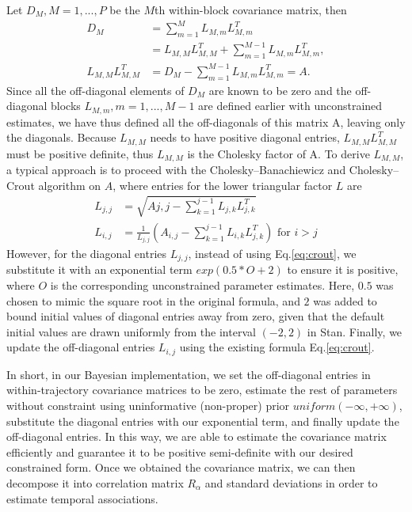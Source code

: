 \documentclass[aoas,preprint]{imsart}
\begin{document}
Let $D_M, M = 1, ..., P$ be the $M$th within-block covariance matrix, then 
\begin{equation}
\begin{aligned}
D_M &= \sum_{m=1}^{M} L_{M,m} L_{M,m}^T \\
&= L_{M,M} L_{M,M}^T + \sum_{m=1}^{M-1} L_{M,m} L_{M,m}^T, \\
L_{M,M} L_{M,M}^T &= D_M - \sum_{m=1}^{M-1} L_{M,m} L_{M,m}^T = A.
\end{aligned}
\end{equation}
Since all the off-diagonal elements of $D_M$ are known to be zero and the off-diagonal blocks $L_{M, m}, m = 1, ..., M-1$ are defined earlier with unconstrained estimates, we have thus defined all the off-diagonals of this matrix A, leaving only the diagonals. Because $L_{M,M}$ needs to have positive diagonal entries, $L_{M,M} L_{M,M}^T$ must be positive definite, thus $L_{M,M}$ is the Cholesky factor of A. To derive $L_{M,M}$, a typical approach is to proceed with the Cholesky–Banachiewicz and Cholesky–Crout algorithm on $A$, where entries for the lower triangular factor $L$ are
\begin{equation}
\begin{aligned}
L_{j,j} &= \sqrt{A{j,j} - \sum_{k=1}^{j-1}L_{j,k}L_{j,k}^T} \\
L_{i,j} &= \frac{1}{L_{j,j}}(A_{i,j} - \sum_{k=1}^{j-1}L_{i,k}L_{j,k}^T) \text{ for } i > j \label{eq:crout}
\end{aligned}
\end{equation}
However, for the diagonal entries $L_{j,j}$, instead of using Eq.\ref{eq:crout}, we substitute it with an exponential term $exp(0.5 * O + 2)$ to ensure it is positive, where $O$ is the corresponding unconstrained parameter estimates. Here, $0.5$ was chosen to mimic the square root in the original formula, and $2$ was added to bound initial values of diagonal entries away from zero, given that the default initial values are drawn uniformly from the interval $(-2, 2)$ in \textsf{Stan}. Finally, we update the off-diagonal entries $L_{i,j}$ using the existing formula Eq.\ref{eq:crout}. 
 
In short, in our Bayesian implementation, we set the off-diagonal entries in within-trajectory covariance matrices to be zero, estimate the rest of parameters without constraint using uninformative (non-proper) prior $uniform(-\infty, +\infty)$, substitute the diagonal entries with our exponential term, and finally update the off-diagonal entries. In this way, we are able to estimate the covariance matrix efficiently and guarantee it to be positive semi-definite with our desired constrained form. Once we obtained the covariance matrix, we can then decompose it into correlation matrix $R_\alpha$ and standard deviations in order to estimate temporal associations. 
\end{document}
